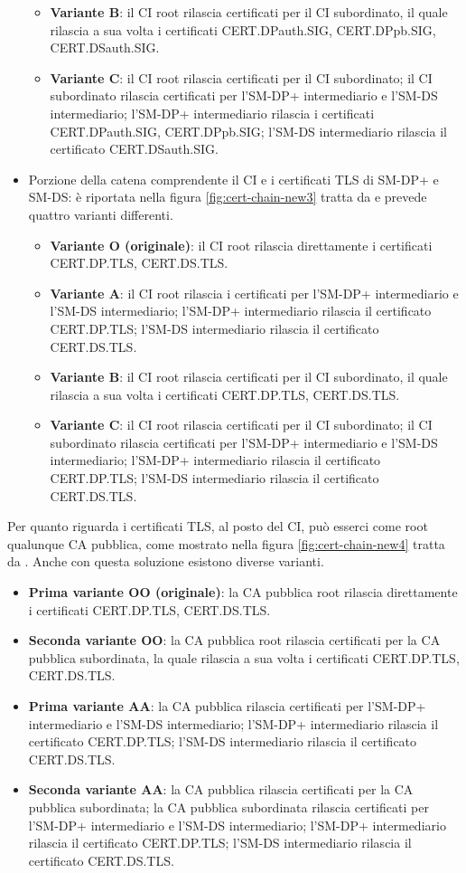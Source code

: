 \documentclass[10pt, twoside, openany]{book}
\begin{document}
\begin{itemize}
\begin{itemize}
\item \textbf{Variante B}: il CI root rilascia certificati per il CI subordinato, il quale rilascia a sua volta i certificati CERT.DPauth.SIG, CERT.DPpb.SIG, CERT.DSauth.SIG.
\item \textbf{Variante C}: il CI root rilascia certificati per il CI subordinato; il CI subordinato rilascia certificati per l'SM-DP+ intermediario e l'SM-DS intermediario; l'SM-DP+ intermediario rilascia i certificati CERT.DPauth.SIG, CERT.DPpb.SIG; l'SM-DS intermediario rilascia il certificato CERT.DSauth.SIG.
\end{itemize}
\item Porzione della catena comprendente il CI e i certificati TLS di SM-DP+ e SM-DS: è riportata nella figura \ref{fig:cert-chain-new3} tratta da \cite{GSMA-docs-new} e prevede quattro varianti differenti.
\begin{itemize}
\item \textbf{Variante O (originale)}: il CI root rilascia direttamente i certificati CERT.DP.TLS, CERT.DS.TLS.
\item \textbf{Variante A}: il CI root rilascia i certificati per l'SM-DP+ intermediario e l'SM-DS intermediario; l'SM-DP+ intermediario rilascia il certificato CERT.DP.TLS; l'SM-DS intermediario rilascia il certificato CERT.DS.TLS.
\item \textbf{Variante B}: il CI root rilascia certificati per il CI subordinato, il quale rilascia a sua volta i certificati CERT.DP.TLS, CERT.DS.TLS.
\item \textbf{Variante C}: il CI root rilascia certificati per il CI subordinato; il CI subordinato rilascia certificati per l'SM-DP+ intermediario e l'SM-DS intermediario; l'SM-DP+ intermediario rilascia il certificato CERT.DP.TLS; l'SM-DS intermediario rilascia il certificato CERT.DS.TLS.
\end{itemize}
\end{itemize}
Per quanto riguarda i certificati TLS, al posto del CI, può esserci come root qualunque CA pubblica, come mostrato nella figura \ref{fig:cert-chain-new4} tratta da \cite{GSMA-docs-new}. Anche con questa soluzione esistono diverse varianti.
\begin{itemize}
\item \textbf{Prima variante OO (originale)}: la CA pubblica root rilascia direttamente i certificati CERT.DP.TLS, CERT.DS.TLS.
\item \textbf{Seconda variante OO}: la CA pubblica root rilascia certificati per la CA pubblica subordinata, la quale rilascia a sua volta i certificati CERT.DP.TLS, CERT.DS.TLS.
\item \textbf{Prima variante AA}: la CA pubblica rilascia certificati per l'SM-DP+ intermediario e l'SM-DS intermediario; l'SM-DP+ intermediario rilascia il certificato CERT.DP.TLS; l'SM-DS intermediario rilascia il certificato CERT.DS.TLS.
\item \textbf{Seconda variante AA}: la CA pubblica rilascia certificati per la CA pubblica subordinata; la CA pubblica subordinata rilascia certificati per l'SM-DP+ intermediario e l'SM-DS intermediario; l'SM-DP+ intermediario rilascia il certificato CERT.DP.TLS; l'SM-DS intermediario rilascia il certificato CERT.DS.TLS.
\end{itemize}
\end{document}

